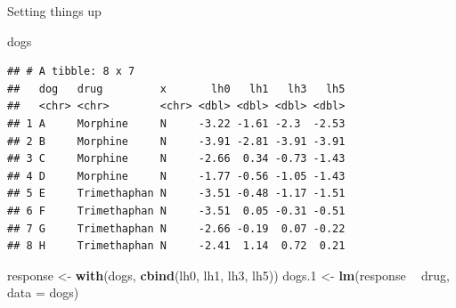 \documentclass[ignorenonframetext,]{beamer}
\newenvironment{Shaded}{\begin{snugshade}}{\end{snugshade}}
\newcommand{\DataTypeTok}[1]{\textcolor[rgb]{0.13,0.29,0.53}{#1}}
\newcommand{\FloatTok}[1]{\textcolor[rgb]{0.00,0.00,0.81}{#1}}
\newcommand{\KeywordTok}[1]{\textcolor[rgb]{0.13,0.29,0.53}{\textbf{#1}}}
\newcommand{\NormalTok}[1]{#1}
\newcommand{\OperatorTok}[1]{\textcolor[rgb]{0.81,0.36,0.00}{\textbf{#1}}}
\newcommand{\StringTok}[1]{\textcolor[rgb]{0.31,0.60,0.02}{#1}}
\begin{document}
\begin{frame}[fragile]{Setting things up}
\protect\hypertarget{setting-things-up}{}

\begin{Shaded}
\begin{Highlighting}[]
\NormalTok{dogs}
\end{Highlighting}
\end{Shaded}

\begin{verbatim}
## # A tibble: 8 x 7
##   dog   drug         x       lh0   lh1   lh3   lh5
##   <chr> <chr>        <chr> <dbl> <dbl> <dbl> <dbl>
## 1 A     Morphine     N     -3.22 -1.61 -2.3  -2.53
## 2 B     Morphine     N     -3.91 -2.81 -3.91 -3.91
## 3 C     Morphine     N     -2.66  0.34 -0.73 -1.43
## 4 D     Morphine     N     -1.77 -0.56 -1.05 -1.43
## 5 E     Trimethaphan N     -3.51 -0.48 -1.17 -1.51
## 6 F     Trimethaphan N     -3.51  0.05 -0.31 -0.51
## 7 G     Trimethaphan N     -2.66 -0.19  0.07 -0.22
## 8 H     Trimethaphan N     -2.41  1.14  0.72  0.21
\end{verbatim}

\begin{Shaded}
\begin{Highlighting}[]
\NormalTok{response <-}\StringTok{ }\KeywordTok{with}\NormalTok{(dogs, }\KeywordTok{cbind}\NormalTok{(lh0, lh1, lh3, lh5))}
\NormalTok{dogs}\FloatTok{.1}\NormalTok{ <-}\StringTok{ }\KeywordTok{lm}\NormalTok{(response }\OperatorTok{~}\StringTok{ }\NormalTok{drug, }\DataTypeTok{data =}\NormalTok{ dogs)}
\end{Highlighting}
\end{Shaded}

\end{frame}
\end{document}
